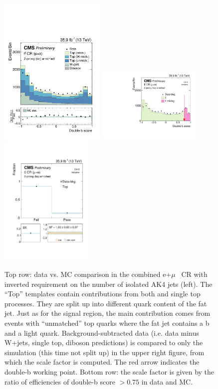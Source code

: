 \begin{figure}[h]
\centering
\includegraphics[width=0.45\textwidth]{figures/dataMC/cr_ttbar_mu_fj1DoubleCSV_2prong.pdf}
\includegraphics[width=0.45\textwidth]{figures/higgstagging/cr_ttbar_mu_fj1DoubleCSV.pdf}\\
\includegraphics[width=0.4\textwidth]{figures/dataMC/cr_ttbar_mu_fj1DoubleCSV_sf.pdf}\\
\caption{Top row: data vs. MC comparison in the combined e+$\mu$ \ttbar~CR with inverted requirement on the number of isolated AK4 jets (left). The ``Top'' templates contain contributions from both \ttbar and single top processes.  They are split up into different quark content of the fat jet. Just as for the signal region, the main contribution comes from events with ``unmatched'' top quarks where the fat jet contains a b and a light quark. Background-subtracted data (i.e. data minus W+jets, single top, diboson predictions) is compared to only the \ttbar simulation (this time not split up) in the upper right figure, from which the scale factor is computed. The red arrow indicates the double-b working point. Bottom row: the scale factor is given by the ratio of efficiencies of double-b score $>0.75$ in data and MC.}
\label{fig:ttbarmistag}
\end{figure}

